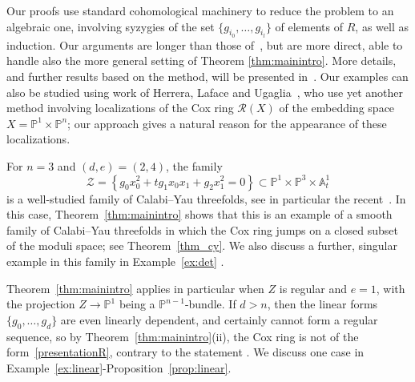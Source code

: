 \documentclass[a4paper,11pt]{amsart}
\theoremstyle{plain}
\theoremstyle{definition}
\newcommand{\A}{\mathbb{A}}
\newcommand{\p}{\mathbb{P}}
\newcommand{\R}{\mathcal{R}}
\begin{document}

Our proofs use standard cohomological machinery to reduce the problem to an algebraic one, involving syzygies of the set $\{g_{i_0}, \dots, g_{i_l}\}$ of elements of $R$, as well as induction. Our arguments are longer than those of~\cite{ottem}, but are more direct, able to handle also the more general setting of Theorem \ref{thm:mainintro}.  More details, and further results based on the method, will be presented in~\cite{pollock}. Our examples can also be studied using work of Herrera, Laface and Ugaglia~\cite{lafaceetal}, who use yet another method involving localizations of the Cox ring $\R(X)$ of the embedding space $X=\p^1\times\p^n$; our approach gives a natural reason for the appearance of these localizations. 

For $n=3$ and $(d,e)=(2,4)$, the family 
\[{\mathcal Z} = \left\{g_0 x_0^2 + t g_1 x_0x_1 + g_2 x_1^2 =0 \right\}\subset \p^1\times \p^3\times \A^1_t
\]
is a well-studied family of Calabi--Yau threefolds, see in particular the recent~\cite{constantinetal, constantin}. In this case, Theorem~\ref{thm:mainintro} shows that this is an example of a smooth family of Calabi--Yau threefolds in which the Cox ring jumps on a closed subset of the moduli space; see Theorem~\ref{thm_cy}. We also discuss a further, singular example in this family in Example~\ref{ex:det} .

Theorem~\ref{thm:mainintro} applies in particular when $Z$ is regular and $e=1$,
with the projection $Z\to\p^1$ being a $\p^{n-1}$-bundle. If $d>n$, then the linear forms $\{g_0, \dots, g_d\}$ 
are even linearly dependent, and certainly cannot form a regular sequence, so by Theorem~\ref{thm:mainintro}(ii), the Cox ring is not of the form~\eqref{presentationR}, contrary to the statement \cite[Thm.1.1(iv)]{ottem}. We discuss one case in Example~\ref{ex:linear}-Proposition~\ref{prop:linear}.
\end{document}
